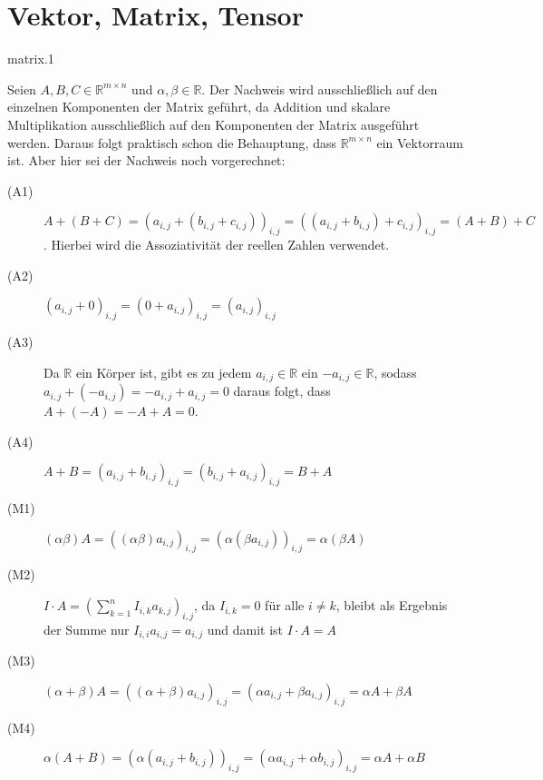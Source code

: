 \section{Vektor, Matrix, Tensor}

\begin{sol}{matrix.1}

Seien $A,B,C\in \mathbb{R}^{m\times n}$ und $\alpha , \beta \in \mathbb{R}$. Der Nachweis wird ausschließlich auf den einzelnen Komponenten der Matrix geführt, da Addition und skalare Multiplikation ausschließlich auf den Komponenten der Matrix ausgeführt werden. Daraus folgt praktisch schon die Behauptung, dass $\mathbb{R}^{m\times n}$ ein Vektorraum ist. Aber hier sei der Nachweis noch vorgerechnet:

\begin{description}
\item[(A1)] $A+(B+C) = (a_{i,j}+(b_{i,j}+c_{i,j}))_{i,j} = ((a_{i,j}+b_{i,j})+c_{i,j})_{i,j} = (A+B)+C$. Hierbei wird die Assoziativität der reellen Zahlen verwendet.
\item[(A2)] $ (a_{i,j}+0)_{i,j} = (0+a_{i,j})_{i,j} = (a_{i,j})_{i,j}$
\item[(A3)] Da $\mathbb{R}$ ein Körper ist, gibt es zu jedem $a_{i,j}\in \mathbb{R}$ ein $ -a_{i,j}\in \mathbb{R}$, sodass $a_{i,j} +(-a_{i,j}) = -a_{i,j} + a_{i,j} = 0$ daraus folgt, dass $A+(-A) = -A +A = 0$.
\item[(A4)] $ A+B = (a_{i,j}+b_{i,j})_{i,j} = (b_{i,j}+a_{i,j})_{i,j} = B+A$
\item[(M1)] $ (\alpha \beta) A = ((\alpha \beta)a_{i,j})_{i,j} = (\alpha (\beta a_{i,j}))_{i,j} = \alpha (\beta A) $
\item[(M2)] $ I\cdot A = ( \sum_{k=1}^{n} I_{i,k}a_{k,j})_{i,j} $, da $I_{i,k}=0$ für alle $i\ne k$, bleibt als Ergebnis der Summe nur $I_{i,i}a_{i,j} = a_{i,j} $ und damit ist $I\cdot A = A$
\item[(M3)] $ (\alpha +\beta )A = ((\alpha + \beta)a_{i,j})_{i,j} = (\alpha a_{i,j} + \beta a_{i,j})_{i,j} = \alpha A + \beta A $
\item[(M4)] $ \alpha (A+B) = (\alpha(a_{i,j} + b_{i,j}))_{i,j} = (\alpha a_{i,j} + \alpha b_{i,j})_{i,j} = \alpha A + \alpha B $
\end{description}

\end{sol}
